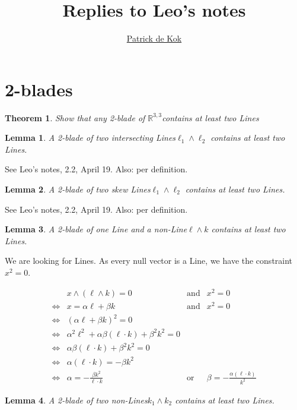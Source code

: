 \documentclass[a4paper,11pt,twoside,openright]{article}
\title{Replies to Leo's notes}
\author{\href{mailto:pkok@science.uva.nl}{Patrick de Kok}}
\newcommand{\textgt}[1]{\textsf{#1}}
\newcommand{\pLine}{\textgt{Line}\xspace}
\newcommand{\pLines}{\textgt{Line}s\xspace}
\newcommand{\Rl}{\ensuremath{\mathbb{R}^{3,3}}}
\newcommand{\en}{\ensuremath{\mathbin{\mbox{and}}}}
\newcommand{\of}{\ensuremath{\mathbin{\mbox{or}}}}
\newcommand{\eql}{\ensuremath{\Leftrightarrow}}
\newtheorem{theorem}{Theorem}
\newtheorem{lemma}{Lemma}
\begin{document}
\maketitle

\section{2-blades}
\begin{theorem}
Show that \emph{any} 2-blade of \Rl contains at least two \pLines
\end{theorem}

\begin{lemma}
A 2-blade of two intersecting \pLines $\ell_1 \wedge \ell_2$ contains at least two \pLines.
\end{lemma}
See Leo's notes, 2.2, April 19.  Also: per definition.

\begin{lemma}
A 2-blade of two skew \pLines $\ell_1 \wedge \ell_2$ contains at least two \pLines.
\end{lemma}
See Leo's notes, 2.2, April 19.  Also: per definition.

\begin{lemma}
A 2-blade of one \pLine and a non-\pLine $\ell \wedge k$ contains at least two \pLines.
\end{lemma}

We are looking for \pLines.  As every null vector is a \pLine, we have the constraint $x^2 = 0$.

\[
\begin{array}{rlcl}
 & x \wedge (\ell \wedge k) = 0 &\en& x^2 = 0 \\
\eql& x = \alpha \ell + \beta k &\en& x^2 = 0 \\
\eql& (\alpha \ell + \beta k)^2 = 0 \\
\eql& \alpha^2 \ell^2 + \alpha \beta \left(\ell \cdot k\right) + \beta^2 k^2 = 0 \\
\eql& \alpha \beta \left(\ell \cdot k\right) + \beta^2 k^2 = 0 \\
\eql& \alpha \left(\ell \cdot k\right) = -\beta k^2 \\
\eql& \alpha = -\frac{\beta k^2}{\ell \cdot k} &\of& \beta = -\frac{\alpha\left(\ell \cdot k\right)}{k^2}
\end{array}
\]

\begin{lemma}
A 2-blade of two non-\pLines $k_1 \wedge k_2$ contains at least two \pLines.
\end{lemma}
\end{document}
